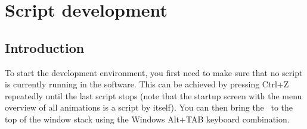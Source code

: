 \chapter{Script development \label{scriptdevelopment}}

\section{Introduction}


To start the development environment, you first need to make sure that no script is currently running in the software. This can be achieved by pressing Ctrl+Z repeatedly until the last script stops (note that the startup screen with the menu overview of all animations is a script by itself). You can then bring the \sourcewin\ to the top of the window stack using the Windows Alt+TAB keyboard combination.

